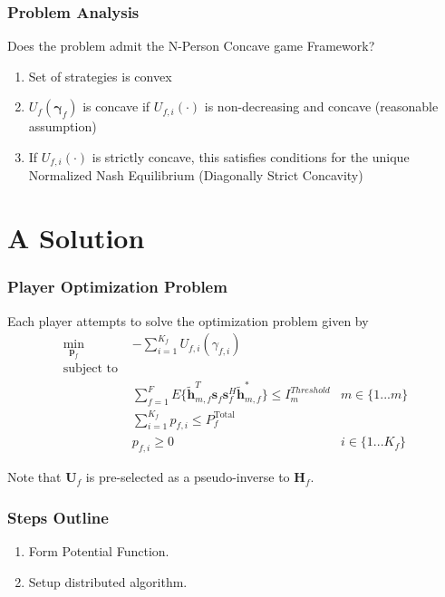 \documentclass[10pt,tgadventor, onlymath]{beamer}
\begin{document}
\begin{frame}
\frametitle{Problem Analysis}
Does the problem admit the N-Person Concave game Framework? 
\\
\begin{enumerate}
\setlength\itemsep{2em}
\item  Set of strategies is convex \faThumbsOUp
\item  $U_{f}(\boldsymbol{\gamma}_{f})$ is concave if 
	$U_{f,i}(\cdot)$ is non-decreasing and concave (reasonable assumption) \faThumbsOUp
\item 
	If $U_{f,i}(\cdot)$ is strictly concave, this satisfies conditions for the unique Normalized Nash Equilibrium (Diagonally Strict Concavity)  \faThumbsOUp
\end{enumerate}

\end{frame}



\section{A Solution}
\begin{frame}
\frametitle{Player Optimization Problem}
Each player attempts to solve the optimization problem given by 
	\begin{subequations}
	\begin{align}
	    \underset{\mathbf{p}_{f} }{\text{min}} \;
	    & - \sum_{i=1}^{K_f}
    	U_{f,i}(\gamma_{f,i}) \label{player_opt_c} \\
	    \text{subject to  }\\
	  &
	  \sum^F_{f=1} E\{ \mathbf{\tilde{h}}_{m,f}^T  \mathbf{s}_{f} 						
	\mathbf{s}_{f}^{H} \mathbf{\tilde{h}}_{m,f}^* \}
	\leq I^{Threshold}		
	_{m} & m \in \{1 ...m\} 
		\label{interference_const_c}\\
        & 
        	\sum_{i=1}^{K_{f}} p_{f,i}
	   \leq P_{f}^{\text{Total}}  \label{power_const_c}\\
        & p_{f,i} \geq 0 &  i\in \{1 ...K_{f}\} \label{pos_power_const_c}
	\end{align}
	\end{subequations}

Note that $\mathbf{U}_{f}$ is pre-selected as a pseudo-inverse to  $\mathbf{H}_f$.
\end{frame}


\begin{frame}
\frametitle{Steps Outline}
\begin{enumerate}
\setlength\itemsep{2em}

\item
	Form Potential Function.
\item
	Setup distributed algorithm.
\end{enumerate}
\end{frame}
\end{document}
